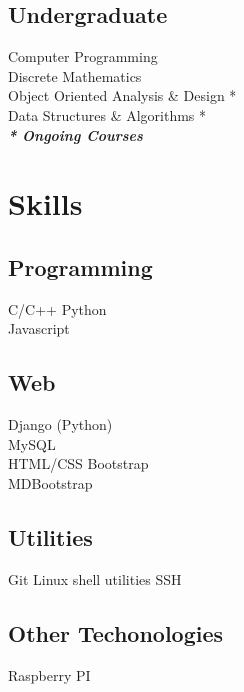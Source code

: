 \documentclass[]{deedy-resume-openfont}
\begin{document}
\begin{minipage}[t]{0.30\textwidth}

\subsection{Undergraduate}
Computer Programming \\
Discrete Mathematics \\
Object Oriented Analysis \& Design * \\
Data Structures \& Algorithms * \\
{\footnotesize \textit{\textbf{* Ongoing Courses}}}
\sectionsep


\section{Skills}
\subsection{Programming}
\textbullet{}   C/C++  \textbullet{} Python \\
\textbullet{} Javascript 
\sectionsep

\subsection{Web}
\textbullet{} Django (Python) \\ \textbullet{} MySQL \\ 
\textbullet{} HTML/CSS \textbullet{} Bootstrap \\ 
\textbullet{} MDBootstrap \\
\sectionsep

\subsection{Utilities}
 \textbullet{} Git \textbullet{} Linux shell utilities \textbullet{} SSH
\sectionsep
\subsection{Other Techonologies}
 \textbullet{} Raspberry PI \\


%
%

\end{minipage} 
\end{document}
